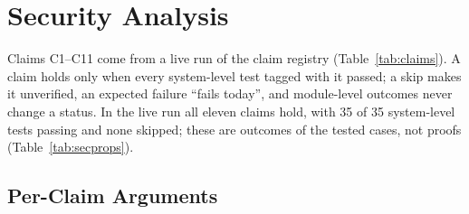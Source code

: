 \section{Security Analysis}\label{sec:security}



Claims C1--C11 come from a live run of the claim registry
(Table~\ref{tab:claims}).
A claim holds only when every system-level test tagged with it passed; a skip
makes it unverified, an expected failure ``fails today'', and module-level
outcomes never change a status.
In the live run all eleven claims hold, with 35 of 35 system-level
tests passing and none skipped; these are outcomes of the tested cases, not
proofs (Table~\ref{tab:secprops}).

\subsection{Per-Claim Arguments}

